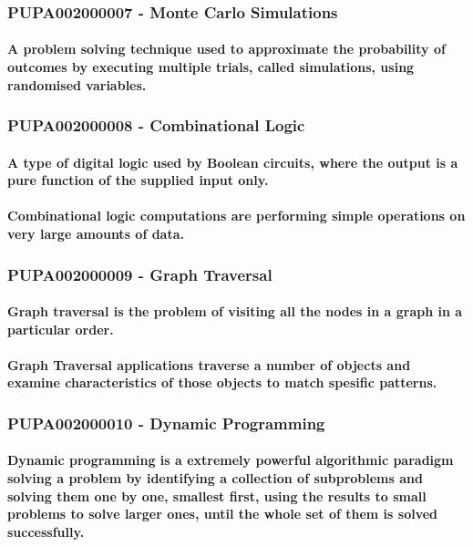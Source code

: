 \subsubsection{PUPA002000007 - Monte Carlo Simulations}
\paragraph{A problem solving technique used to approximate the probability of outcomes by executing multiple trials, called simulations, using randomised variables.}
\subsubsection{PUPA002000008 - Combinational Logic}
\paragraph{A type of digital logic used by Boolean circuits, where the output is a pure function of the supplied input only.}
\paragraph{Combinational logic computations are performing simple operations on very large amounts of data.}
\subsubsection{PUPA002000009 - Graph Traversal}
\paragraph{Graph traversal is the problem of visiting all the nodes in a graph in a particular order.}
\paragraph{Graph Traversal applications traverse a number of objects and examine characteristics of those objects to match spesific patterns.}
\subsubsection{PUPA002000010 - Dynamic Programming}
\paragraph{Dynamic programming is a extremely powerful algorithmic paradigm solving a problem by identifying a collection of subproblems and solving them one by one, smallest first, using the results to small problems to solve larger ones, until the whole set of them is solved successfully.}
